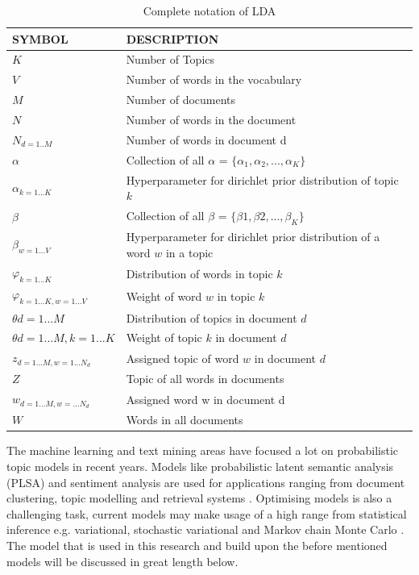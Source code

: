 \begin{table}[h]
\centering
 \begin{tabular}{l l} 
 \hline
 SYMBOL & DESCRIPTION \\ 
 \hline
 $K$ & Number of Topics \\  
 $V$ & Number of words in the vocabulary \\
 $M$ & Number of documents \\
 $N$ & Number of words in the document \\
 $N_{d=1..M}$ & Number of words in document d\\
 $\alpha$ & Collection of all $\alpha$ = $ \{ \alpha_{1},\alpha_{2}, ... , \alpha_{K}\}$ \\
 $\alpha_{k=1...K}$ & Hyperparameter for dirichlet prior distribution of topic $k$ \\
 $\beta$ &  Collection of all $\beta$ = $\{\beta{1},\beta{2}, ... , \beta_{K}\}$ \\
 $\beta_{w=1...V}$ & Hyperparameter for dirichlet prior distribution of a word $w$ in a topic \\
 $\varphi_{k=1...K}$ & Distribution of words in topic $k$ \\
 $\varphi_{k=1...K, w=1...V}$ & Weight of  word $w$ in topic $k$  \\
 $\theta{d=1...M}$ & Distribution of topics in document $d$  \\
 $\theta{d=1...M, k=1...K}$ & Weight of  topic $k$ in document $d$ \\
 $z_{d=1...M, w=1...N_d}$ & Assigned topic of word $w$ in document $d$\\
 $Z$ & Topic of all words in documents \\
 $w_{d=1...M, w=...N_d}$ & Assigned word w in document d \\ 
 $W$ & Words in all documents \\ 

 \hline
 \end{tabular}
\caption{Complete notation of LDA}
\label{tab:table1}
\end{table}

The machine learning and text mining areas have focused a lot on probabilistic topic models in recent years. Models like probabilistic latent semantic analysis (PLSA) and sentiment analysis are used for applications ranging from document clustering, topic modelling and retrieval systems \cite{Lu2011InvestigatingLDA}. Optimising models is also a challenging task, current models may make usage of a high range from statistical inference e.g. variational, stochastic variational and Markov chain Monte Carlo \cite{Hoffman2016MarkovModels}. The model that is used in this research and build upon the before mentioned models will be discussed in great length below.

